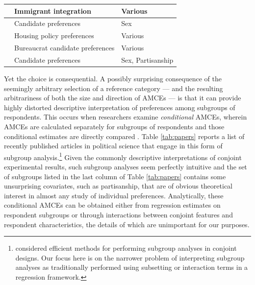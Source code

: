 \documentclass[a4paper,12pt]{article}\usepackage[]{graphicx}\usepackage[]{color}
\begin{document}
\begin{table}
\begin{center}
\begin{tabular}{p{2in} p{2in} p{2in}}
\citet{Sobolewskaetal2017} & Immigrant integration & Various \\ \midrule
\citet{EggersVivyanWagner2018} & Candidate preferences & Sex \\ \midrule
\citet{Hankinson2018} & Housing policy preferences & Various \\ \midrule
\citet{OliverosSchuster2018} & Bureaucrat candidate preferences & Various \\ \midrule
\citet{TeeleKallaRosenbluth2018} & Candidate preferences & Sex, Partisanship \\
\bottomrule
\end{tabular}
\end{center}
\end{table}

Yet the choice is consequential. A possibly surprising consequence of the seemingly arbitrary selection of a reference category --- and the resulting arbitrariness of both the size and direction of AMCEs --- is that it can provide highly distorted descriptive interpretation of preferences among subgroups of respondents. This occurs when researchers examine \textit{conditional} AMCEs, wherein AMCEs are calculated separately for subgroups of respondents and those conditional estimates are directly compared \citep[13]{HainmuellerHopkinsYamamoto2014}. Table \ref{tab:papers} reports a list of recently published articles in political science that engage in this form of subgroup analysis.\footnote{\citet{RatkovicTingley2017} considered efficient methods for performing subgroup analyses in conjoint designs. Our focus here is on the narrower problem of interpreting subgroup analyses as traditionally performed using subsetting or interaction terms in a regression framework.} Given the commonly descriptive interpretations of conjoint experimental results, such subgroup analyses seem perfectly intuitive and the set of subgroups listed in the last column of Table \ref{tab:papers} contains some unsurprising covariates, such as partisanship, that are of obvious theoretical interest in almost any study of individual preferences. Analytically, these conditional AMCEs can be obtained either from regression estimates on respondent subgroups or through interactions between conjoint features and respondent characteristics, the details of which are unimportant for our purposes.
\end{document}
